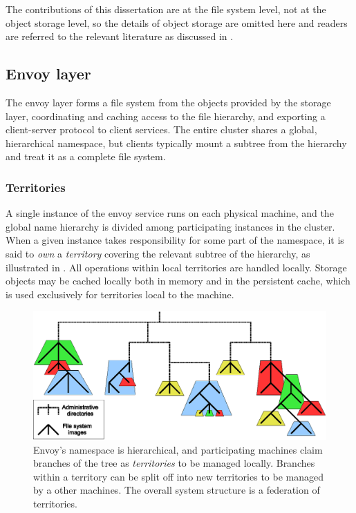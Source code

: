 The contributions of this dissertation are at the file system level, not at the object storage level, so the details of object storage are omitted here and readers are referred to the relevant literature as discussed in .

\subsection{Envoy layer}

The envoy layer forms a file system from the objects provided by the storage layer, coordinating and caching access to the file hierarchy, and exporting a client-server protocol to client services. The entire cluster shares a global, hierarchical namespace, but clients typically mount a subtree from the hierarchy and treat it as a complete file system.

\subsubsection{Territories}

A single instance of the envoy service runs on each physical machine, and the global name hierarchy is divided among participating instances in the cluster. When a given instance takes responsibility for some part of the namespace, it is said to \emph{own} a \emph{territory} covering the relevant subtree of the hierarchy, as illustrated in . All operations within local territories are handled locally. Storage objects may be cached locally both in memory and in the persistent cache, which is used exclusively for territories local to the machine.

\begin{figure}[tp]
\centering
\includegraphics[width=\figwidth]{figures/territory-structure}
\caption[Territories partitioning the namespace tree]{Envoy's namespace is hierarchical, and participating machines claim branches of the tree as \emph{territories} to be managed locally. Branches within a territory can be split off into new territories to be managed by a other machines. The overall system structure is a federation of territories.}
\label{fig:territory-structure}
\end{figure}


